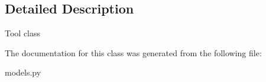 \subsection{Detailed Description}
\begin{DoxyVerb}Tool class
\end{DoxyVerb}
 

The documentation for this class was generated from the following file\-:\begin{DoxyCompactItemize}
\item 
models.\-py\end{DoxyCompactItemize}
